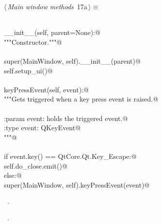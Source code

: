 \documentclass[
    a4paper,      %
    10pt,         %
    openright,    %
    notitlepage,  %
    parskip=half, %
]{scrreprt}       %
\theoremstyle{definition}                    %
\begin{document}
\begin{flushleft} \small
\begin{minipage}{\linewidth}\label{scrap7}\raggedright\small
{} $\langle\,${\itshape Main window methods}\nobreak\ {\footnotesize {17a}}$\,\rangle\equiv$
\vspace{-1ex}
\begin{list}{}{} \item
\mbox{}\lstinline@@\\
\mbox{}\lstinline@def __init__(self, parent=None):@\\
\mbox{}\lstinline@    """Constructor."""@\\
\mbox{}\lstinline@@\\
\mbox{}\lstinline@    super(MainWindow, self).__init__(parent)@\\
\mbox{}\lstinline@    self.setup_ui()@\\
\mbox{}\lstinline@@\\
\mbox{}\lstinline@def keyPressEvent(self, event):@\\
\mbox{}\lstinline@    """Gets triggered when a key press event is raised.@\\
\mbox{}\lstinline@@\\
\mbox{}\lstinline@    :param event: holds the triggered event.@\\
\mbox{}\lstinline@    :type  event: QKeyEvent@\\
\mbox{}\lstinline@    """@\\
\mbox{}\lstinline@@\\
\mbox{}\lstinline@    if event.key() == QtCore.Qt.Key_Escape:@\\
\mbox{}\lstinline@        self.do_close.emit()@\\
\mbox{}\lstinline@    else:@\\
\mbox{}\lstinline@        super(MainWindow, self).keyPressEvent(event)@\\
\mbox{}\lstinline@@{\NWsep}
\end{list}
\vspace{-1.5ex}
\footnotesize
\begin{list}{}{\setlength{\itemsep}{-\parsep}\setlength{\itemindent}{-\leftmargin}}
\item \NWtxtMacroDefBy\ .
\item \NWtxtMacroRefIn\ .

\item{}
\end{list}
\end{minipage}\vspace{4ex}
\end{flushleft}
\end{document}
